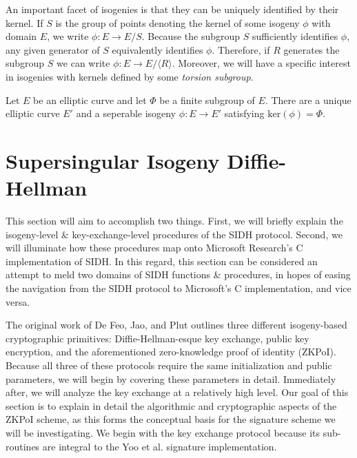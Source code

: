 An important facet of isogenies is that they can be uniquely identified by their kernel. If $S$ is the group of points denoting the kernel of some isogeny $\phi$ with domain $E$, we write $\phi: E \rightarrow E/S$. Because the subgroup $S$ sufficiently identifies $\phi$, any given generator of $S$ equivalently identifies $\phi$. Therefore, if $R$ generates the subgroup $S$ we can write $\phi: E \rightarrow E/\langle R \rangle$. Moreover, we will have a specific interest in isogenies with kernels defined by some \emph{torsion subgroup}. 

\begin{tcolorbox}
\begin{lemma}
\label{lem:isogkern}
Let $E$ be an elliptic curve and let $\Phi$ be a finite subgroup of $E$. There are a unique elliptic curve $E'$ and a seperable isogeny $\phi: E \rightarrow E'$ satisfying $\text{ker}(\phi) = \Phi$.
\end{lemma}
\end{tcolorbox}

\section{Supersingular Isogeny Diffie-Hellman}

This section will aim to accomplish two things. First, we will briefly explain the isogeny-level \& key-exchange-level procedures of the SIDH protocol. Second, we will illuminate how these procedures map onto Microsoft Research's C implementation of SIDH. In this regard, this section can be considered an attempt to meld two domains of SIDH functions \& procedures, in hopes of easing the navigation from the SIDH protocol to Microsoft's C implementation, and vice versa.

The original work of De Feo, Jao, and Plut \cite{djp} outlines three different isogeny-based cryptographic primitives: Diffie-Hellman-esque key exchange, public key encryption, and the aforementioned zero-knowledge proof of identity (ZKPoI). Because all three of these protocols require the same initialization and public parameters, we will begin by covering these parameters in detail. Immediately after, we will analyze the key exchange at a relatively high level. Our goal of this section is to explain in detail the algorithmic and cryptographic aspects of the ZKPoI scheme, as this forms the conceptual basis for the signature scheme we will be investigating. We begin with the key exchange protocol because its sub-routines are integral to the Yoo et al. signature implementation.

